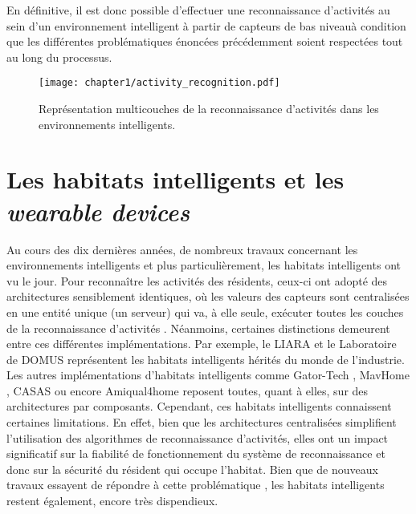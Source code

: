 {{En définitive, il est donc possible d'effectuer une reconnaissance d'activités au sein d'un environnement intelligent à partir de capteurs de bas niveau\textemdash à condition que les différentes problématiques énoncées précédemment soient respectées tout au long du processus.

\begin{figure}[H]
	\centering
	\texttt{[image: chapter1/activity\_recognition.pdf]}
	\caption{Représentation multicouches de la reconnaissance d'activités dans les environnements intelligents.}
	\label{fig:activity_recognition}
\end{figure}

\section{Les habitats intelligents et les \textit{wearable devices}}

Au cours des dix dernières années, de nombreux travaux concernant les environnements intelligents et plus particulièrement, les habitats intelligents ont vu le jour. Pour reconnaître les activités des résidents, ceux-ci ont adopté des architectures sensiblement identiques, où les valeurs des capteurs sont centralisées en une entité unique (un serveur) qui va, à elle seule, exécuter toutes les couches de la reconnaissance d’activités \citep{Bouchard2014, Hu2016}. Néanmoins, certaines distinctions demeurent entre ces différentes implémentations. Par exemple, le \ac{LIARA} \citep{Bouchard2014} et le Laboratoire de \ac{DOMUS} \citep{Giroux2009} représentent les habitats intelligents hérités du monde de l’industrie. Les autres implémentations d'habitats intelligents comme Gator-Tech \citep{Helal2005}, MavHome \citep{DJCook2003}, CASAS \citep{Cook2013} ou encore Amiqual4home \citep{Lago2017} reposent toutes, quant à elles, sur des architectures par composants. Cependant, ces habitats intelligents connaissent certaines limitations. En effet, bien que les architectures centralisées simplifient l'utilisation des algorithmes de reconnaissance d'activités, elles ont un impact significatif sur la fiabilité de fonctionnement du système de reconnaissance et donc sur la sécurité du résident qui occupe l'habitat. Bien que de nouveaux travaux essayent de répondre à cette problématique \citep{Cook2013, Plantevin2018}, les habitats intelligents restent également, encore très dispendieux.

}}
